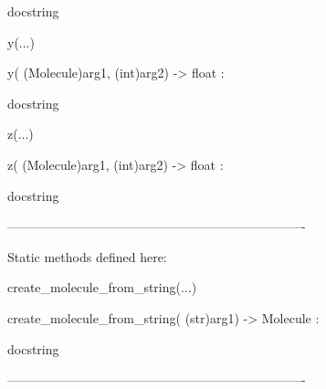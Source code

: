 \documentclass[letterpaper,10pt,english]{sphinxmanual}
\begin{document}
\begin{description}
\begin{description}
\begin{DUlineblock}{0em}
\begin{DUlineblock}{\DUlineblockindent}
\begin{DUlineblock}{\DUlineblockindent}
\item[] docstring
\item[] 
\end{DUlineblock}
\end{DUlineblock}
\item[] y(...)
\item[]
\begin{DUlineblock}{\DUlineblockindent}
\item[] y( (Molecule)arg1, (int)arg2) -\textgreater{} float :
\item[]
\begin{DUlineblock}{\DUlineblockindent}
\item[] docstring
\item[] 
\end{DUlineblock}
\end{DUlineblock}
\item[] z(...)
\item[]
\begin{DUlineblock}{\DUlineblockindent}
\item[] z( (Molecule)arg1, (int)arg2) -\textgreater{} float :
\item[]
\begin{DUlineblock}{\DUlineblockindent}
\item[] docstring
\item[] 
\end{DUlineblock}
\end{DUlineblock}
\item[] ----------------------------------------------------------------------
\item[] Static methods defined here:
\item[] 
\item[] create\_molecule\_from\_string(...)
\item[]
\begin{DUlineblock}{\DUlineblockindent}
\item[] create\_molecule\_from\_string( (str)arg1) -\textgreater{} Molecule :
\item[]
\begin{DUlineblock}{\DUlineblockindent}
\item[] docstring
\item[] 
\end{DUlineblock}
\end{DUlineblock}
\item[] ----------------------------------------------------------------------

\end{DUlineblock}
\end{description}
\end{description}
\end{document}
